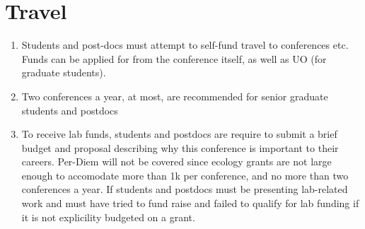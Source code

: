 \documentclass[12pt]{article}
\begin{document}
\section{Travel}
\begin{enumerate}
\item Students and post-docs must attempt to self-fund travel to
  conferences etc. Funds can be applied for from the conference
  itself, as well as UO (for graduate students). 
\item Two conferences a year, at most, are recommended
  for senior graduate students and postdocs
\item To receive lab funds, students and postdocs are require to
  submit a brief budget and proposal describing why this conference is
  important to their careers. Per-Diem will not be covered since
  ecology grants are not large enough to accomodate more than 1k per
  conference, and no more than two conferences a year. If students and
  postdocs must be presenting lab-related work and must have tried to
  fund raise and failed to qualify for lab funding if it is not
  explicility budgeted on a grant.
\end{enumerate}
\end{document}
